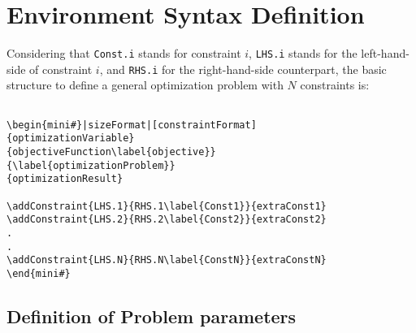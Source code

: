\documentclass[a4paper]{article}
\begin{document}
\section{Environment Syntax Definition}
Considering that \verb|Const.i| stands for constraint $i$, \verb|LHS.i| stands for the left-hand-side of constraint $i$, and \verb|RHS.i| for the right-hand-side counterpart, the basic structure to define a general optimization problem with $N$ constraints is:
\begin{verbatim}

\begin{mini#}|sizeFormat|[constraintFormat]
{optimizationVariable}
{objectiveFunction\label{objective}}
{\label{optimizationProblem}}  
{optimizationResult}

\addConstraint{LHS.1}{RHS.1\label{Const1}}{extraConst1}
\addConstraint{LHS.2}{RHS.2\label{Const2}}{extraConst2}
.
.
\addConstraint{LHS.N}{RHS.N\label{ConstN}}{extraConstN}
\end{mini#}
\end{verbatim}

\subsection{Definition of Problem parameters}
\end{document}
